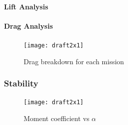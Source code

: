 \documentclass[report]{byu-aero}
\begin{document}
\paragraph{Lift Analysis}


\paragraph{Drag Analysis}

\begin{figure}[h!]
	\centering
	\texttt{[image: draft2x1]}
	\caption{Drag breakdown for each mission}
	\label{fig:dragbreakdown}
\end{figure}


\subsubsection{Stability}
\label{sssec:stability}

\begin{figure}[h!]
	\centering
	\texttt{[image: draft2x1]}
	\caption{Moment coefficient vs \(\alpha\)}
	\label{fig:cmva}
\end{figure}
\end{document}
